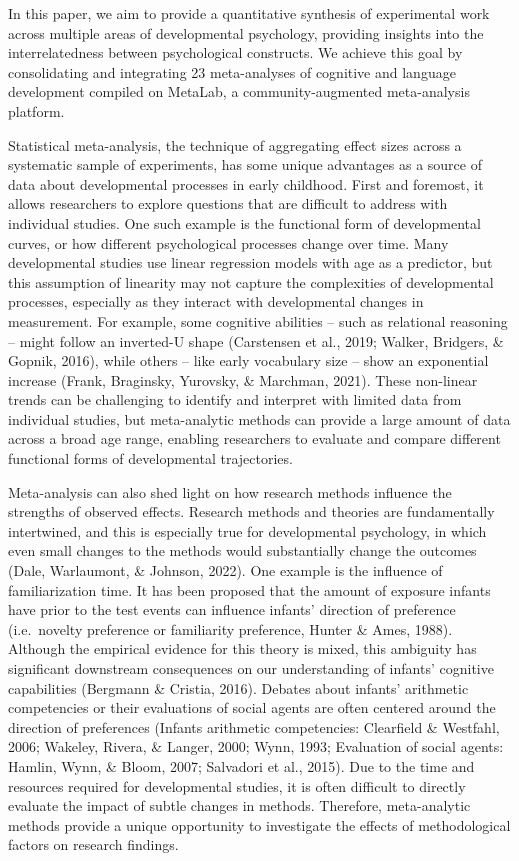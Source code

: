 \documentclass[10pt, letterpaper]{article}
\begin{document}
In this paper, we aim to provide a quantitative synthesis of
experimental work across multiple areas of developmental psychology,
providing insights into the interrelatedness between psychological
constructs. We achieve this goal by consolidating and integrating 23
meta-analyses of cognitive and language development compiled on MetaLab,
a community-augmented meta-analysis platform.

Statistical meta-analysis, the technique of aggregating effect sizes
across a systematic sample of experiments, has some unique advantages as
a source of data about developmental processes in early childhood. First
and foremost, it allows researchers to explore questions that are
difficult to address with individual studies. One such example is the
functional form of developmental curves, or how different psychological
processes change over time. Many developmental studies use linear
regression models with age as a predictor, but this assumption of
linearity may not capture the complexities of developmental processes,
especially as they interact with developmental changes in measurement.
For example, some cognitive abilities -- such as relational reasoning --
might follow an inverted-U shape (Carstensen et al., 2019; Walker,
Bridgers, \& Gopnik, 2016), while others -- like early vocabulary size
-- show an exponential increase (Frank, Braginsky, Yurovsky, \&
Marchman, 2021). These non-linear trends can be challenging to identify
and interpret with limited data from individual studies, but
meta-analytic methods can provide a large amount of data across a broad
age range, enabling researchers to evaluate and compare different
functional forms of developmental trajectories.

Meta-analysis can also shed light on how research methods influence the
strengths of observed effects. Research methods and theories are
fundamentally intertwined, and this is especially true for developmental
psychology, in which even small changes to the methods would
substantially change the outcomes (Dale, Warlaumont, \& Johnson, 2022).
One example is the influence of familiarization time. It has been
proposed that the amount of exposure infants have prior to the test
events can influence infants' direction of preference (i.e.~novelty
preference or familiarity preference, Hunter \& Ames, 1988). Although
the empirical evidence for this theory is mixed, this ambiguity has
significant downstream consequences on our understanding of infants'
cognitive capabilities (Bergmann \& Cristia, 2016). Debates about
infants' arithmetic competencies or their evaluations of social agents
are often centered around the direction of preferences (Infants
arithmetic competencies: Clearfield \& Westfahl, 2006; Wakeley, Rivera,
\& Langer, 2000; Wynn, 1993; Evaluation of social agents: Hamlin, Wynn,
\& Bloom, 2007; Salvadori et al., 2015). Due to the time and resources
required for developmental studies, it is often difficult to directly
evaluate the impact of subtle changes in methods. Therefore,
meta-analytic methods provide a unique opportunity to investigate the
effects of methodological factors on research findings.
\end{document}
